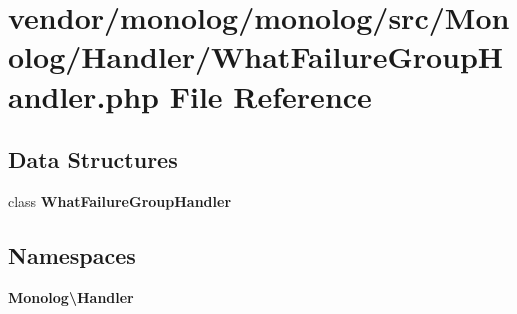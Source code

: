 \section{vendor/monolog/monolog/src/\+Monolog/\+Handler/\+What\+Failure\+Group\+Handler.php File Reference}
\label{_what_failure_group_handler_8php}
\subsection*{Data Structures}
\begin{DoxyCompactItemize}
\item 
class {\bf What\+Failure\+Group\+Handler}
\end{DoxyCompactItemize}
\subsection*{Namespaces}
\begin{DoxyCompactItemize}
\item 
 {\bf Monolog\textbackslash{}\+Handler}
\end{DoxyCompactItemize}
